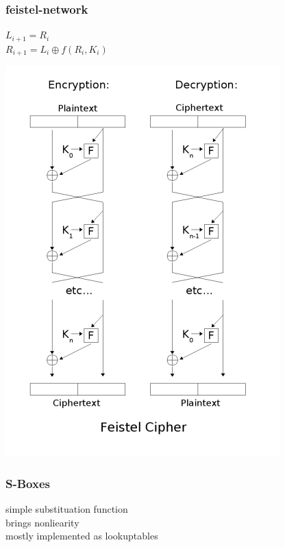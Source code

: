 \begin{frame}
\frametitle{feistel-network}
	$L_{i+1} = R_i $ \\
	$R_{i+1} = L_i \oplus f(R_i, K_i)$
	\begin{center}
		\includegraphics[scale=0.3]{Feistel}
	\end{center}
\end{frame}


\begin{frame}
\frametitle{S-Boxes}
	simple substituation function\\
	brings nonliearity\\
	mostly implemented as lookuptables
\end{frame}


